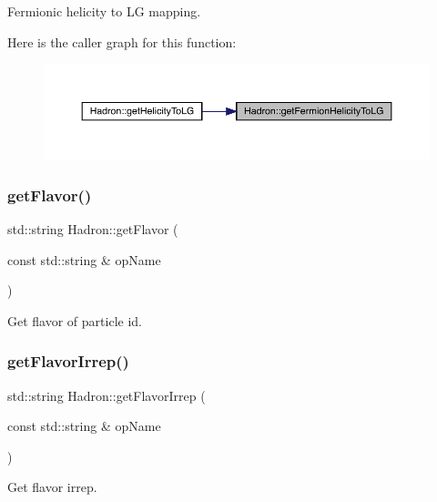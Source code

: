 Fermionic helicity to LG mapping. 

Here is the caller graph for this function\+:\nopagebreak
\begin{figure}[H]
\begin{center}
\leavevmode
\includegraphics[width=350pt]{d1/daf/namespaceHadron_af7b75d50b2ca47d90a4d42ff7152bf4d_icgraph}
\end{center}
\end{figure}
\mbox{\label{namespaceHadron_adfbec5b7f783df2c9cefec3692adf179}} 
\subsubsection{\texorpdfstring{getFlavor()}{getFlavor()}}
{\footnotesize\ttfamily std\+::string Hadron\+::get\+Flavor (\begin{DoxyParamCaption}\item[{const std\+::string \&}]{op\+Name }\end{DoxyParamCaption})}



Get flavor of particle id. 

\mbox{\label{namespaceHadron_ad5a318554ed24d3e28841abd57345adf}} 
\subsubsection{\texorpdfstring{getFlavorIrrep()}{getFlavorIrrep()}}
{\footnotesize\ttfamily std\+::string Hadron\+::get\+Flavor\+Irrep (\begin{DoxyParamCaption}\item[{const std\+::string \&}]{op\+Name }\end{DoxyParamCaption})}



Get flavor irrep. 

\mbox{\label{namespaceHadron_aeab17d669da3fa4a904236091bd5384f}} 
